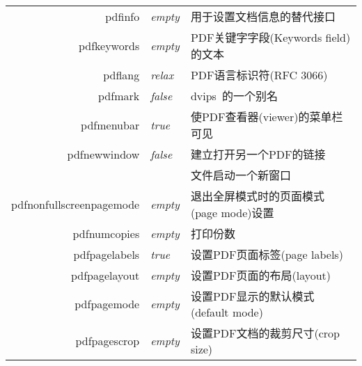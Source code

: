 \documentclass{article}
\begin{document}
\begin{longtable}{@{}>{\ttfamily}rlp{7cm}@{}}
    pdfinfo                           & \textit{empty}         & 用于设置文档信息的替代接口                                                                                   \\
    pdfkeywords                       & \textit{empty}         & PDF关键字字段(Keywords field)的文本                                                                     \\
    pdflang                           & \textit{relax}         & PDF语言标识符(RFC 3066)                                                                              \\
    pdfmark                           & \textit{false}         & \textsf{dvips}\ 的一个别名                                                                           \\
    pdfmenubar                        & \textit{true}          & 使PDF查看器(viewer)的菜单栏可见                                                                           \\
    pdfnewwindow                      & \textit{false}         & 建立打开另一个PDF的链接                                                                                   \\
                                      &                        & 文件启动一个新窗口                                                                                       \\
    pdfnonfullscreenpagemode
                                      & \textit{empty}         & 退出全屏模式时的页面模式(page mode)设置                                                                       \\
    pdfnumcopies                      & \textit{empty}         & 打印份数                                                                                            \\
    pdfpagelabels                     & \textit{true}          & 设置PDF页面标签(page labels)                                                                          \\
    pdfpagelayout                     & \textit{empty}         & 设置PDF页面的布局(layout)                                                                              \\
    pdfpagemode                       & \textit{empty}         & 设置PDF显示的默认模式(default mode)                                                                      \\
    pdfpagescrop                      & \textit{empty}         & 设置PDF文档的裁剪尺寸(crop size)                                                                         \\

\end{longtable}
\end{document}
